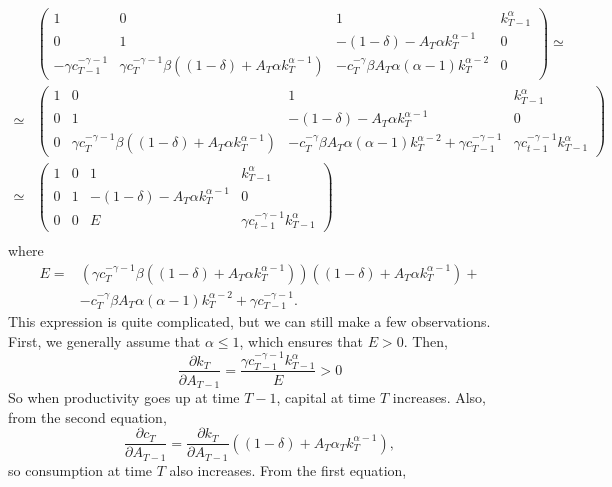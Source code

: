 \documentclass[12pt,reqno]{amsart}
\theoremstyle{definition}
\begin{document}
\begin{align*}
  & \begin{pmatrix} 
    1 & 0 & 1 & k_{T-1}^\alpha \\
    0 & 1 & -(1-\delta) - A_T\alpha k_T^{\alpha-1} & 0 \\
    -\gamma c_{T-1}^{-\gamma-1} & \gamma c_{T}^{-\gamma-1}
    \beta\left((1-\delta) + A_T \alpha k_T^{\alpha-1}\right) &
    -c_T^{-\gamma} \beta A_T \alpha (\alpha-1) k_T^{\alpha-2} & 0
  \end{pmatrix} \simeq \\
  \simeq &   \begin{pmatrix} 
    1 & 0 & 1 & k_{T-1}^\alpha \\
    0 & 1 & -(1-\delta) - A_T\alpha k_T^{\alpha-1} & 0 \\
    0 & \gamma c_{T}^{-\gamma-1}
    \beta\left((1-\delta) + A_T \alpha k_T^{\alpha-1}\right) &    
    -c_T^{-\gamma} \beta A_T \alpha (\alpha-1) k_T^{\alpha-2} + \gamma
    c_{T-1}^{-\gamma-1} & \gamma c_{t-1}^{-\gamma-1} k_{T-1}^\alpha 
  \end{pmatrix}  \\
  \simeq &   \begin{pmatrix} 
    1 & 0 & 1 & k_{T-1}^\alpha \\
    0 & 1 & -(1-\delta) - A_T\alpha k_T^{\alpha-1} & 0 \\
    0 & 0 & E & \gamma c_{t-1}^{-\gamma-1} k_{T-1}^\alpha
  \end{pmatrix} \\
\end{align*}
where
\begin{align*}
  E = &\left(\gamma c_{T}^{-\gamma-1} \beta\left((1-\delta) + A_T
      \alpha k_T^{\alpha-1}\right)\right)
  \left((1-\delta) + A_T\alpha k_T^{\alpha-1} \right) + \\
  & -c_T^{-\gamma} \beta A_T \alpha (\alpha-1) k_T^{\alpha-2} + \gamma 
  c_{T-1}^{-\gamma-1}.
\end{align*}
This expression is quite complicated, but we can still make a few
observations. First, we generally assume that $\alpha \leq 1$, which ensures
that $E > 0$. Then,
\[ 
\frac{\partial k_T}{\partial A_{T-1}} = \frac{\gamma
  c_{T-1}^{-\gamma-1} k_{T-1}^\alpha} {E} > 0 \]
So when productivity goes up at time $T-1$, capital at time $T$
increases. Also, from the second equation,
\[ \frac{\partial c_T}{\partial A_{T-1}} = \frac{\partial
  k_T}{\partial A_{T-1}}  \left((1-\delta) + A_T \alpha _T
  k_T^{\alpha-1} \right), \]
so consumption at time $T$ also increases. From the first equation,
\end{document}
